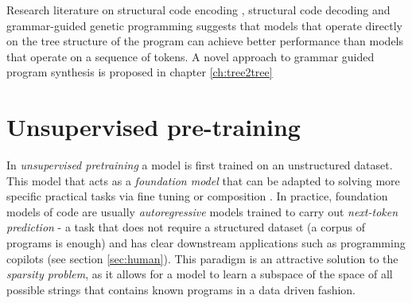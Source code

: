 Research literature on structural code encoding \cite{alon2019structural,zhang2015tree}, structural code decoding \cite{jiang2021ast,zhu2019grammarcnn} and grammar-guided genetic programming \cite{bunelLeveragingGrammarReinforcement2018, manriqueGrammarguidedGeneticProgramming2009, sobaniaChallengesProgramSynthesis2020a} suggests that models that operate directly on the tree structure of the program can achieve better performance than models that operate on a sequence of tokens.
A novel approach to grammar guided program synthesis is proposed in chapter \ref{ch:tree2tree}

\newpage
\section{Unsupervised pre-training}
\label{sec:pretrain}

In \emph{unsupervised pretraining} a model is first trained on an unstructured dataset.
This model that acts as a \emph{foundation model} \cite{yangFoundationModelsDecision2023, yuanPowerFoundationModels2023, zhouComprehensiveSurveyPretrained2023} that can be adapted to solving more specific practical tasks via fine tuning \cite{panTransferLearning2020, weissSurveyTransferLearning2016a, zhuangComprehensiveSurveyTransfer2020} or composition \cite{shivakumarStudyImpactLanguage2017}.
In practice, foundation models of code are usually \emph{autoregressive} models trained to carry out \emph{next-token prediction} \cite{shlegerisLanguageModelsAre2024} - a task that does not require a structured dataset (a corpus of programs is enough) and has clear downstream applications such as programming copilots (see section \ref{sec:human}).
This paradigm is an attractive solution to the \emph{sparsity problem}, as it allows for a model to learn a subspace of the space of all possible strings that contains known programs in a data driven fashion.


